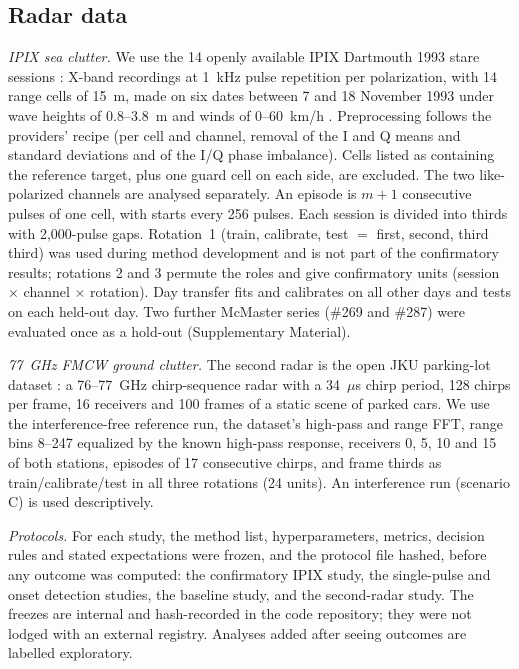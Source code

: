 \documentclass[journal]{IEEEtran}
\begin{document}
\subsection{Radar data}
\emph{IPIX sea clutter.} We use the 14 openly available IPIX Dartmouth 1993 stare sessions \cite{ipixweb}: X-band recordings at 1~kHz pulse repetition per polarization, with 14 range cells of 15~m, made on six dates between 7 and 18 November 1993 under wave heights of 0.8--3.8~m and winds of 0--60~km/h \cite{haykin1995,farina1997,haykin2002}. Preprocessing follows the providers' recipe (per cell and channel, removal of the I and Q means and standard deviations and of the I/Q phase imbalance). Cells listed as containing the reference target, plus one guard cell on each side, are excluded. The two like-polarized channels are analysed separately. An episode is $m+1$ consecutive pulses of one cell, with starts every 256 pulses. Each session is divided into thirds with 2,000-pulse gaps. Rotation~1 (train, calibrate, test $=$ first, second, third third) was used during method development and is not part of the confirmatory results; rotations 2 and 3 permute the roles and give \NUnitsConf{} confirmatory units (session $\times$ channel $\times$ rotation). Day transfer fits and calibrates on all other days and tests on each held-out day. Two further McMaster series (\#269 and \#287) were evaluated once as a hold-out (Supplementary Material).

\emph{77~GHz FMCW ground clutter.} The second radar is the open JKU parking-lot dataset \cite{jku2026}: a 76--77~GHz chirp-sequence radar with a 34~$\mu$s chirp period, 128 chirps per frame, 16 receivers and 100 frames of a static scene of parked cars. We use the interference-free reference run, the dataset's high-pass and range FFT, range bins 8--247 equalized by the known high-pass response, receivers 0, 5, 10 and 15 of both stations, episodes of 17 consecutive chirps, and frame thirds as train/calibrate/test in all three rotations (24 units). An interference run (scenario C) is used descriptively.

\emph{Protocols.} For each study, the method list, hyperparameters, metrics, decision rules and stated expectations were frozen, and the protocol file hashed, before any outcome was computed: the confirmatory IPIX study, the single-pulse and onset detection studies, the baseline study, and the second-radar study. The freezes are internal and hash-recorded in the code repository; they were not lodged with an external registry. Analyses added after seeing outcomes are labelled exploratory.
\end{document}
